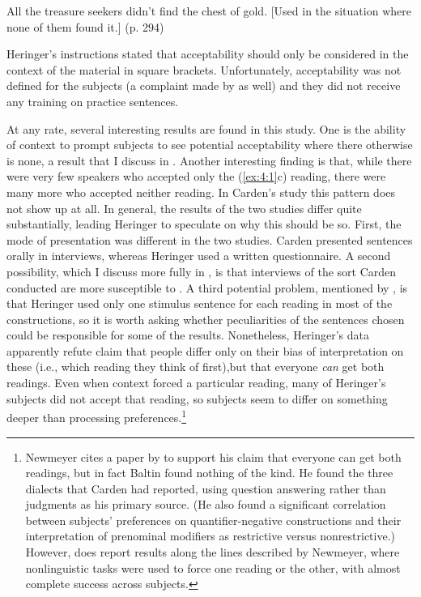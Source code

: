 \ea\label{ex:4:3}
      All the treasure seekers didn't find the chest of gold. [Used in the situation where none of them found it.] (p. 294)    
\z

\noindent
Heringer's instructions stated that acceptability should only be considered  in the context of the material in square brackets. Unfortunately, acceptability was not defined for the subjects (a complaint made by \citet{Carden1970a} as well) and they did not receive any training on practice sentences.

At any rate, several interesting results are found in this study. One is the ability of context to prompt subjects to see potential acceptability where there otherwise is none, a result that I discuss in . Another interesting finding is that, while there were very few speakers who accepted only the (\ref{ex:4:1}c) reading, there were many more who accepted neither reading. In Carden's study  this  pattern does not show up at all. In general, the results of the two studies differ quite substantially, leading Heringer to speculate on why this should be so. First, the mode of presentation was different in the two studies. Carden presented sentences orally in interviews, whereas Heringer used a written questionnaire. A second possibility, which I discuss more fully in , is that interviews of the sort Carden conducted are more susceptible to . A third potential problem, mentioned by \citet{Carden1970a}, is that Heringer used only one stimulus sentence for each reading in most of the constructions, so it is worth asking whether peculiarities of the sentences chosen could be responsible for some of the results. Nonetheless, Heringer's data apparently refute  claim that people differ only on their bias of interpretation on these  (i.e., which reading they think of first),but that everyone \textit{can} get both readings. Even when context forced a particular reading, many of Heringer's subjects did not accept that reading, so subjects seem to differ on something deeper than processing preferences.\footnote{Newmeyer cites a paper by \citet{Baltin1977} to support his claim that everyone can get both readings, but in fact Baltin found nothing of the kind. He found the three dialects that Carden had reported, using question answering rather than judgments as his primary source. (He also found a significant correlation between subjects' preferences on quantifier-negative constructions and their interpretation of prenominal modifiers as restrictive versus nonrestrictive.) However, \citet{Labov1975}
does report results along the lines described by Newmeyer, where nonlinguistic tasks were used to force one reading or the other, with almost complete success across subjects.}
